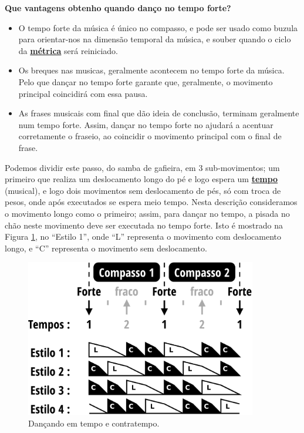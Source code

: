\begin{tcbinformation} 
\label{ref:beneficiosdancarforte}
\textbf{Que vantagens obtenho quando danço no tempo forte?}
\begin{itemize}
\item O tempo forte da música é único no compasso, 
e pode ser usado como buzula para orientar-nos na dimensão temporal da música, 
e souber quando o ciclo da \hyperref[def:Metrica]{\textbf{métrica}} será reiniciado.
\item Os breques nas musicas, geralmente acontecem no tempo forte da música.
Pelo que dançar no tempo forte garante que, geralmente, 
o movimento principal coincidirá com essa pausa.
\item As frases musicais com final que dão ideia de conclusão,
terminam geralmente num tempo forte.
Assim, dançar no tempo forte no ajudará a acentuar corretamente o fraseio,
ao coincidir o movimento principal com o final de frase. 
\end{itemize}
\end{tcbinformation} 

\begin{example}
\label{ex:frentetrasex}
Podemos dividir este passo, do samba de gafieira, em 3 sub-movimentos; 
um primeiro que realiza um deslocamento longo do pé e logo espera um \hyperref[sec:Tempo]{\textbf{tempo}} (musical),
e logo dois movimentos sem deslocamento de pés, só com troca de pesos,
 onde após executados se espera meio tempo.  
Nesta descrição consideramos o movimento longo como o primeiro;
assim, para dançar no tempo, a pisada no chão neste movimento deve ser executada no tempo forte.
Isto é mostrado na Figura \ref{fig:tempovscontratempo}, no ``Estilo 1'',
onde ``L'' representa o movimento com deslocamento longo,
e ``C'' representa o movimento sem deslocamento.
\end{example}


\begin{figure}[h]
    \centering 
\includegraphics[width=0.9\textwidth]{chapters/cap-musicalidade/bailarcontratempo.eps}
    \caption{Dançando em tempo e contratempo.}\label{fig:tempovscontratempo}
\end{figure}




